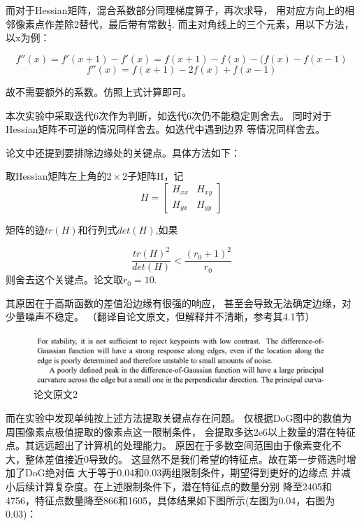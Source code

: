 \documentclass{article}
\begin{document}
    而对于Hessian矩阵，混合系数部分同理梯度算子，再次求导，
    用对应方向上的相邻像素点作差除2替代，最后带有常数\(\frac{1}{4}\).
    而主对角线上的三个元素，用以下方法，以x为例：

\[
    f''(x) = f'(x + 1) - f'(x) = f(x + 1) - f(x) - (f(x) - f(x - 1)
\]
\[
    f''(x) = f(x + 1) - 2f(x) + f(x - 1)
\]

    故不需要额外的系数。仿照上式计算即可。

    本次实验中采取迭代6次作为判断，如迭代6次仍不能稳定则舍去。
    同时对于Hessian矩阵不可逆的情况同样舍去。如迭代中遇到边界
    等情况同样舍去。

    论文中还提到要排除边缘处的关键点。具体方法如下：

    取Hessian矩阵左上角的\(2\times 2\)子矩阵H，记
\[
    H = \begin{bmatrix}
            H_{xx} & H_{xy} \\
            H_{yx} & H_{yy}
    \end{bmatrix}
\]

    矩阵的迹\(tr(H)\)和行列式\(det(H)\),如果

\[
    \frac{tr(H)^2}{det(H)} < \frac{(r_0 + 1)^2}{r_0}
\]
    则舍去这个关键点。论文取\(r_0 = 10\).

    其原因在于高斯函数的差值沿边缘有很强的响应，
    甚至会导致无法确定边缘，对少量噪声不稳定。
    （翻译自论文原文，但解释并不清晰，参考其4.1节）

\begin{figure}[h]
\centering
\includegraphics[width=1\textwidth]{./others/a2}
\caption{论文原文2}
\end{figure}

    而在实验中发现单纯按上述方法提取关键点存在问题。
    仅根据DoG图中的数值为周围像素点极值提取的像素点这一限制条件，
    会提取多达2e6以上数量的潜在特征点。其远远超出了计算机的处理能力。
    原因在于多数空间范围由于像素变化不大，整体差值接近0导致的。
    这显然不是我们希望的特征点。故在第一步筛选时增加了DoG绝对值
    大于等于0.04和0.03两组限制条件，期望得到更好的边缘点
    并减小后续计算复杂度。在上述限制条件下，潜在特征点的数量分别
    降至2405和4756，特征点数量降至866和1605，具体结果如下图所示(左图为0.04，右图为0.03)：

\newpage
\end{document}
